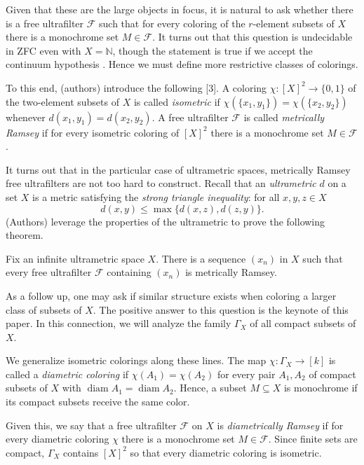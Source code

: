Given that these are the large objects in focus, it is natural to ask whether there is a free ultrafilter \( \mathcal{F}  \) such that for every coloring of the \( r \)-element subsets of \( X \) there is a monochrome set \( M \in \mathcal{F}  \). It turns out that this question is undecidable in ZFC even with \( X = \mathbb{N}  \), though the statement is true if we accept the continuum hypothesis \cite{protasov:2017}. Hence we must define more restrictive classes of colorings.

To this end, (authors) introduce the following [3]. A coloring \( \chi : [X]^{2} \to \{ 0 , 1 \}  \) of the two-element subsets of \( X \) is called \emph{isometric} if \( \chi (\{ x_1, y_1 \} ) = \chi (\{ x_2, y_2 \} ) \) whenever \( d(x_1, y_1) = d(x_2, y_2) \). A free ultrafilter \( \mathcal{F}  \) is called \emph{metrically Ramsey} if for every isometric coloring of \( [X]^{2}  \) there is a monochrome set \( M \in \mathcal{F}  \).

It turns out that in the particular case of ultrametric spaces, metrically Ramsey free ultrafilters are not too hard to construct. Recall that an \emph{ultrametric} \( d \) on a set \( X \) is a metric satisfying the \emph{strong triangle inequality}: for all \( x,y,z \in X \) \[ d(x,y) \leq \max \{ d(x,z), d(z,y) \}.  \] (Authors) leverage the properties of the ultrametric to prove the following theorem.

\begin{theorem}
\label{thm:1}
Fix an infinite ultrametric space \( X \). There is a sequence \( (x_{n}) \) in \( X \) such that every free ultrafilter \( \mathcal{F}  \) containing \( (x_{n}) \) is metrically Ramsey.
\end{theorem}

As a follow up, one may ask if similar structure exists when coloring a larger class of subsets of \( X \). The positive answer to this question is the keynote of this paper. In this connection, we will analyze the family \( \Gamma_{X}  \) of all compact subsets of \( X \).

We generalize isometric colorings along these lines. The map \( \chi : \Gamma_{X}  \to [k] \) is called a \emph{diametric coloring} if \( \chi (A_1) = \chi (A_2) \) for every pair \( A_1, A_2 \) of compact subsets of \( X \) with \( \operatorname{diam} A_1 = \operatorname{diam} A_2  \). Hence, a subset \( M \subseteq X \) is monochrome if its compact subsets receive the same color. 

Given this, we say that a free ultrafilter \( \mathcal{F}  \) on \( X \) is \emph{diametrically Ramsey} if for every diametric coloring \( \chi \) there is a monochrome set \( M  \in \mathcal{F}  \). Since finite sets are compact, \( \Gamma_{X}  \) contains \( [X]^{2}  \) so that every diametric coloring is isometric.

